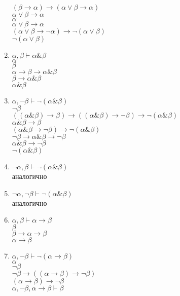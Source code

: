 \begin{enumerate}
$(\beta \to \alpha) \to (\alpha \lor \beta \to \alpha)$ \\
$\alpha \lor \beta \to \alpha$ \\
$\alpha$ \\
$\alpha \lor \beta \to \alpha$ \\
$(\alpha \lor \beta \to \lnot \alpha) \to \lnot (\alpha \lor \beta)$ \\
$\lnot (\alpha \lor \beta)$
\item $\alpha, \beta \vdash \alpha \& \beta$ \\
$\alpha$ \\
$\beta$ \\
$\alpha \to \beta \to \alpha \& \beta$ \\
$\beta \to \alpha \& \beta$ \\
$\alpha \& \beta$
\item $\alpha, \lnot \beta \vdash \lnot (\alpha \& \beta)$ \\
$\lnot \beta$ \\
$((\alpha \& \beta) \to \beta) \to ((\alpha \& \beta) \to \lnot \beta) \to \lnot (\alpha \& \beta)$ \\
$\alpha \& \beta \to \beta$ \\
$(\alpha \& \beta \to \lnot \beta) \to \lnot (\alpha \& \beta)$ \\
$\lnot \beta \to \alpha \& \beta \to \lnot \beta$ \\
$\alpha \& \beta \to \lnot \beta$ \\
$\lnot (\alpha \& \beta)$
\item $\lnot \alpha, \beta \vdash \lnot (\alpha \& \beta)$ \\
аналогично
\item $\lnot \alpha, \lnot \beta \vdash \lnot (\alpha \& \beta)$ \\
аналогично
\item $\alpha, \beta \vdash \alpha \to \beta$ \\
$\beta$ \\
$\beta \to \alpha \to \beta$ \\
$\alpha \to \beta$
\item $\alpha, \lnot \beta \vdash \lnot (\alpha \to \beta)$ \\
$\alpha$ \\
$\lnot \beta$ \\
$\lnot \beta \to ((\alpha \to \beta) \to \lnot \beta)$ \\
$(\alpha \to \beta) \to \lnot \beta$ \\
$\alpha, \lnot \beta, \alpha \to \beta \vdash \beta$ \\

\end{enumerate}
